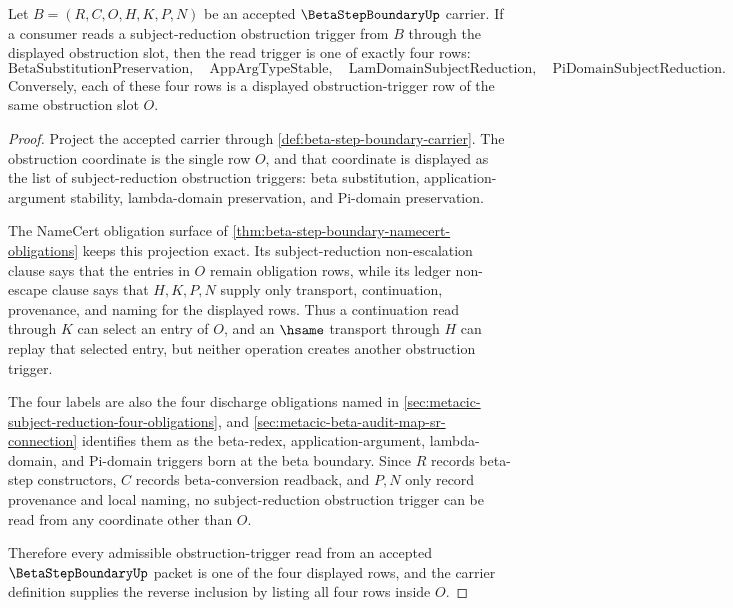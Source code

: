 \begin{lemma}
\label{lem:beta-step-boundary-obstruction-trigger-enumeration}
Let $B=(R,C,O,H,K,P,N)$ be an accepted $\BetaStepBoundaryUp$ carrier. If a consumer reads a subject-reduction obstruction trigger from $B$ through the displayed obstruction slot, then the read trigger is one of exactly four rows:
$$
\mathrm{BetaSubstitutionPreservation},\quad
\mathrm{AppArgTypeStable},\quad
\mathrm{LamDomainSubjectReduction},\quad
\mathrm{PiDomainSubjectReduction}.
$$
Conversely, each of these four rows is a displayed obstruction-trigger row of the same obstruction slot $O$.
\end{lemma}
\begin{proof}
Project the accepted carrier through \autoref{def:beta-step-boundary-carrier}. The obstruction coordinate is the single row $O$, and that coordinate is displayed as the list of subject-reduction obstruction triggers: beta substitution, application-argument stability, lambda-domain preservation, and Pi-domain preservation.

The NameCert obligation surface of \autoref{thm:beta-step-boundary-namecert-obligations} keeps this projection exact. Its subject-reduction non-escalation clause says that the entries in $O$ remain obligation rows, while its ledger non-escape clause says that $H,K,P,N$ supply only transport, continuation, provenance, and naming for the displayed rows. Thus a continuation read through $K$ can select an entry of $O$, and an $\hsame$ transport through $H$ can replay that selected entry, but neither operation creates another obstruction trigger.

The four labels are also the four discharge obligations named in \autoref{sec:metacic-subject-reduction-four-obligations}, and \autoref{sec:metacic-beta-audit-map-sr-connection} identifies them as the beta-redex, application-argument, lambda-domain, and Pi-domain triggers born at the beta boundary. Since $R$ records beta-step constructors, $C$ records beta-conversion readback, and $P,N$ only record provenance and local naming, no subject-reduction obstruction trigger can be read from any coordinate other than $O$.

Therefore every admissible obstruction-trigger read from an accepted $\BetaStepBoundaryUp$ packet is one of the four displayed rows, and the carrier definition supplies the reverse inclusion by listing all four rows inside $O$.
\end{proof}

